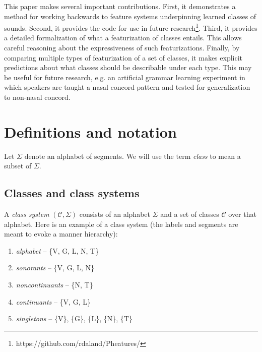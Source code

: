 \documentclass[11pt, oneside]{article}   	%
\begin{document}
This paper makes several important contributions. First, it demonstrates a method for working backwards to feature systems underpinning learned classes of sounds. Second, it provides the code for use in future research\footnote{https://github.com/rdaland/Pheatures/}. Third, it provides a detailed formalization of what a featurization of classes entails. This allows careful reasoning about the expressiveness of such featurizations. Finally, by comparing multiple types of featurization of a set of classes, it makes explicit predictions about what classes should be describable under each type. This may be useful for future research, e.g. an artificial grammar learning experiment in which speakers are taught a nasal concord pattern and tested for generalization to non-nasal concord.

\section{Definitions and notation}

Let $\Sigma$ denote an alphabet of segments. We will use the term \textit{class} to mean a subset of $\Sigma$.

\subsection{Classes and class systems}

A \textit{class system} $(\mathcal C, \Sigma)$ consists of an alphabet $\Sigma$ and a set of classes $\mathcal C$ over that alphabet. Here is an example of a class system (the labels and segments are meant to evoke a manner hierarchy): \begin{enumerate}
  \item \textit{alphabet} -- \{V, G, L, N, T\}
  \item \textit{sonorants} -- \{V, G, L, N\}
  \item \textit{noncontinuants} -- \{N, T\}
  \item \textit{continuants} -- \{V, G, L\}
  \item \textit{singletons} -- \{V\}, \{G\}, \{L\}, \{N\}, \{T\}
  \end{enumerate}
\end{document}
